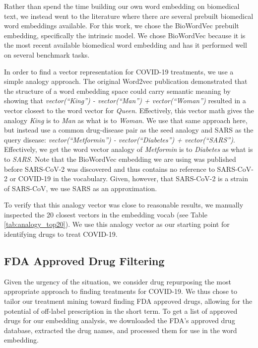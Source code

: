 \documentclass{article}
\begin{document}
Rather than spend the time building our own word embedding on biomedical text, we instead went to the literature where there are several prebuilt biomedical word embeddings available.
For this work, we chose the BioWordVec\cite{zhang2019biowordvec} prebuilt embedding, specifically the intrinsic model.
We chose BioWordVec because it is the most recent available biomedical word embedding and has it performed well on several benchmark tasks.

In order to find a vector representation for COVID-19 treatments, we use a simple analogy approach.
The original Word2vec publication demonstrated that the structure of a word embedding space could carry semantic meaning by showing that \emph{vector(``King'') - vector(``Man'') + vector(``Woman'')} resulted in a vector closest to the word vector for \emph{Queen}\cite{mikolov2013efficient}.
Effectively, this vector math gives the analogy \emph{King} is to \emph{Man} as what is to \emph{Woman}.
We use that same approach here, but instead use a common drug-disease pair as the seed analogy and SARS as the query disease: \emph{vector(``Metformin'') - vector(``Diabetes'') + vector(``SARS'')}.
Effectively, we get the word vector analogy of \emph{Metformin} is to \emph{Diabetes} as what is to \emph{SARS}.
Note that the BioWordVec embedding we are using was published before SARS-CoV-2 was discovered and thus contains no reference to SARS-CoV-2 or COVID-19 in the vocabulary.
Given, however, that SARS-CoV-2 is a strain of SARS-CoV\cite{of2020species}, we use SARS as an approximation.

To verify that this analogy vector was close to reasonable results, we manually inspected the 20 closest vectors in the embedding vocab (see Table \ref{tab:analogy_top20}).
We use this analogy vector as our starting point for identifying drugs to treat COVID-19.


\subsection{FDA Approved Drug Filtering}

Given the urgency of the situation, we consider drug repurposing the most appropriate approach to finding treatments for COVID-19.
We thus chose to tailor our treatment mining toward finding FDA approved drugs, allowing for the potential of off-label prescription in the short term.
To get a list of approved drugs for our embedding analysis, we downloaded the FDA's approved drug database\cite{fdadrugs}, extracted the drug names, and processed them for use in the word embedding.
\end{document}
